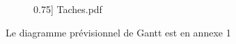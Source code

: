 
\begin{figure}[!h]
 0.75] {Taches.pdf}
\end{figure}

Le diagramme prévisionnel de Gantt est en annexe 1